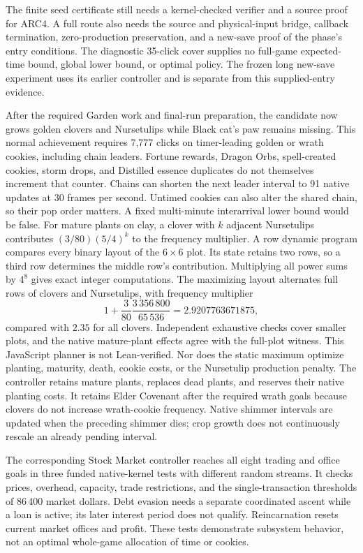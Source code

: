 \documentclass[11pt,a4paper]{article}
\numberwithin{equation}{section}
\theoremstyle{definition}
\theoremstyle{remark}
\begin{document}
The finite seed certificate still needs a kernel-checked verifier and a source proof for ARC4. A full route also needs the source and physical-input bridge, callback termination, zero-production preservation, and a new-save proof of the phase's entry conditions. The diagnostic 35-click cover supplies no full-game expected-time bound, global lower bound, or optimal policy. The frozen long new-save experiment uses its earlier controller and is separate from this supplied-entry evidence.

After the required Garden work and final-run preparation, the candidate now grows golden clovers and Nursetulips while Black cat's paw remains missing. This normal achievement requires 7,777 clicks on timer-leading golden or wrath cookies, including chain leaders. Fortune rewards, Dragon Orbs, spell-created cookies, storm drops, and Distilled essence duplicates do not themselves increment that counter. Chains can shorten the next leader interval to 91 native updates at 30 frames per second. Untimed cookies can also alter the shared chain, so their pop order matters. A fixed multi-minute interarrival lower bound would be false. For mature plants on clay, a clover with $k$ adjacent Nursetulips contributes $(3/80)(5/4)^k$ to the frequency multiplier. A row dynamic program compares every binary layout of the $6\times6$ plot. Its state retains two rows, so a third row determines the middle row's contribution. Multiplying all power sums by $4^8$ gives exact integer computations. The maximizing layout alternates full rows of clovers and Nursetulips, with frequency multiplier
\[
 1+\frac{3}{80}\frac{3\,356\,800}{65\,536}
 =2.9207763671875,
\]
compared with $2.35$ for all clovers. Independent exhaustive checks cover smaller plots, and the native mature-plant effects agree with the full-plot witness. This JavaScript planner is not Lean-verified. Nor does the static maximum optimize planting, maturity, death, cookie costs, or the Nursetulip production penalty. The controller retains mature plants, replaces dead plants, and reserves their native planting costs. It retains Elder Covenant after the required wrath goals because clovers do not increase wrath-cookie frequency. Native shimmer intervals are updated when the preceding shimmer dies; crop growth does not continuously rescale an already pending interval.

The corresponding Stock Market controller reaches all eight trading and office goals in three funded native-kernel tests with different random streams. It checks prices, overhead, capacity, trade restrictions, and the single-transaction thresholds of 86\,400 market dollars. Debt evasion needs a separate coordinated ascent while a loan is active; its later interest period does not qualify. Reincarnation resets current market offices and profit. These tests demonstrate subsystem behavior, not an optimal whole-game allocation of time or cookies.
\end{document}
